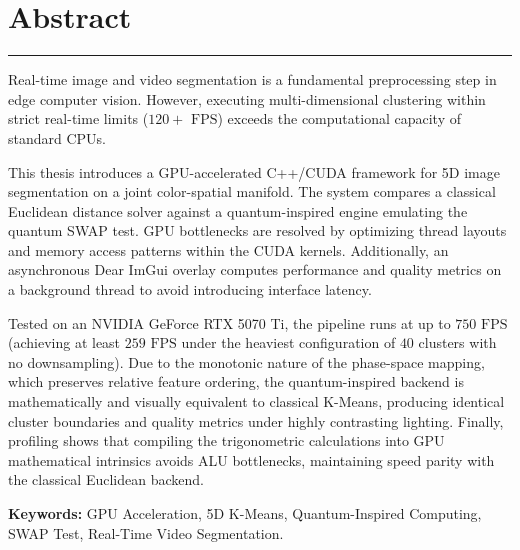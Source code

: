 \chapter*{Abstract}
\vspace{0.5cm}
\hrule
\vspace{0.5cm}

Real-time image and video segmentation is a fundamental preprocessing step in edge computer vision. However, executing multi-dimensional clustering within strict real-time limits ($120+\text{ FPS}$) exceeds the computational capacity of standard CPUs.

This thesis introduces a GPU-accelerated C++/CUDA framework for 5D image segmentation on a joint color-spatial manifold. The system compares a classical Euclidean distance solver against a quantum-inspired engine emulating the quantum SWAP test. GPU bottlenecks are resolved by optimizing thread layouts and memory access patterns within the CUDA kernels. Additionally, an asynchronous Dear ImGui overlay computes performance and quality metrics on a background thread to avoid introducing interface latency.

Tested on an NVIDIA GeForce RTX 5070 Ti, the pipeline runs at up to $750\text{ FPS}$ (achieving at least $259\text{ FPS}$ under the heaviest configuration of $40$ clusters with no downsampling). Due to the monotonic nature of the phase-space mapping, which preserves relative feature ordering, the quantum-inspired backend is mathematically and visually equivalent to classical K-Means, producing identical cluster boundaries and quality metrics under highly contrasting lighting. Finally, profiling shows that compiling the trigonometric calculations into GPU mathematical intrinsics avoids ALU bottlenecks, maintaining speed parity with the classical Euclidean backend.

\vspace{1.5cm}
\noindent \textbf{Keywords:} GPU Acceleration, 5D K-Means, Quantum-Inspired Computing, SWAP Test, Real-Time Video Segmentation.